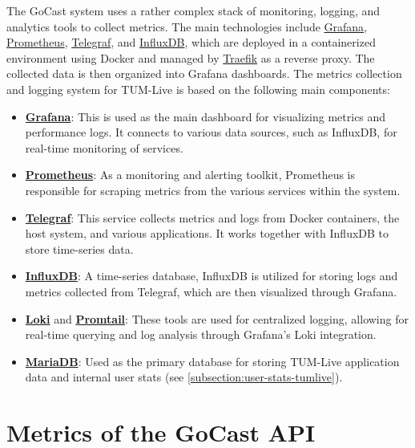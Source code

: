 The GoCast system uses a rather complex stack of monitoring, logging, and analytics tools to collect metrics. The main technologies include \href{https://github.com/grafana/grafana}{Grafana}, \href{https://github.com/prometheus/prometheus}{Prometheus}, \href{https://github.com/influxdata/telegraf}{Telegraf}, and \href{https://github.com/influxdata/influxdb}{InfluxDB}, which are deployed in a containerized environment using Docker and managed by \href{https://github.com/traefik/traefik}{Traefik} as a reverse proxy. The collected data is then organized into Grafana dashboards. The metrics collection and logging system for TUM-Live is based on the following main components:
\begin{itemize}
    \item \textbf{\href{https://github.com/grafana/grafana}{Grafana}}: This is used as the main dashboard for visualizing metrics and performance logs. It connects to various data sources, such as InfluxDB, for real-time monitoring of services.
    \item \textbf{\href{https://github.com/prometheus/prometheus}{Prometheus}}: As a monitoring and alerting toolkit, Prometheus is responsible for scraping metrics from the various services within the system.
    \item \textbf{\href{https://github.com/influxdata/telegraf}{Telegraf}}: This service collects metrics and logs from Docker containers, the host system, and various applications. It works together with InfluxDB to store time-series data.
    \item \textbf{\href{https://github.com/influxdata/influxdb}{InfluxDB}}: A time-series database, InfluxDB is utilized for storing logs and metrics collected from Telegraf, which are then visualized through Grafana.
    \item \textbf{\href{https://github.com/grafana/loki}{Loki}} and \textbf{\href{https://grafana.com/docs/loki/latest/send-data/promtail/}{Promtail}}: These tools are used for centralized logging, allowing for real-time querying and log analysis through Grafana's Loki integration.
    \item \textbf{\href{https://mariadb.org/}{MariaDB}}: Used as the primary database for storing TUM-Live application data and internal user stats (see \autoref{subsection:user-stats-tumlive}).
\end{itemize}

\section{Metrics of the GoCast API}

